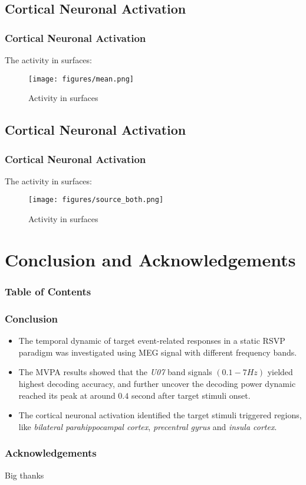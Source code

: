 \documentclass[aspectratio=169]{beamer}
\begin{document}
\subsection{Cortical Neuronal Activation}
\begin{frame}
    \frametitle{Cortical Neuronal Activation}
    The activity in surfaces:
    \begin{figure}[h]
        \centering
        \texttt{[image: figures/mean.png]}
        \caption{Activity in surfaces}
    \end{figure}
\end{frame}

\subsection{Cortical Neuronal Activation}
\begin{frame}
    \frametitle{Cortical Neuronal Activation}
    The activity in surfaces:
    \begin{figure}[h]
        \centering
        \texttt{[image: figures/source\_both.png]}
        \caption{Activity in surfaces}
    \end{figure}
\end{frame}

\section{Conclusion and Acknowledgements}
\begin{frame}[plain]
    \frametitle{Table of Contents}
\end{frame}

\begin{frame}
    \frametitle{Conclusion}
    \begin{itemize}
        \item The temporal dynamic of target event-related responses in a static RSVP paradigm was investigated using MEG signal with different frequency bands.
        \item The MVPA results showed that the \emph{U07} band signals $(0.1-7 Hz)$ yielded highest decoding accuracy, and further uncover the decoding power dynamic reached its peak at around $0.4$ second after target stimuli onset.
        \item The cortical neuronal activation identified the target stimuli triggered regions, like \emph{bilateral parahippocampal cortex}, \emph{precentral gyrus} and \emph{insula cortex}.
    \end{itemize}
\end{frame}

\begin{frame}
    \frametitle{Acknowledgements}
    Big thanks
\end{frame}
\end{document}
